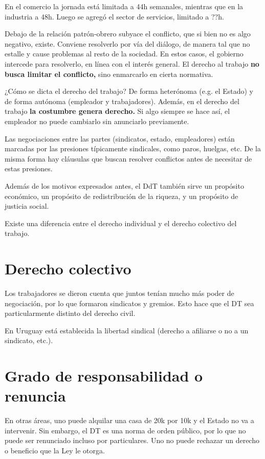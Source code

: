 \documentclass[../main.tex]{subfiles}
\begin{document}
En el comercio la jornada está limitada a 44h semanales, mientras que en la industria a 48h.
Luego se agregó el sector de servicios, limitado a ??h.

Debajo de la relación patrón-obrero subyace el conflicto, que si bien no es algo negativo, existe.
Conviene resolverlo por vía del diálogo, de manera tal que no estalle y cause problemas al resto de la sociedad.
En estos casos, el gobierno intercede para resolverlo, en línea con el interés general.
El derecho al trabajo \textbf{no busca limitar el conflicto,} sino enmarcarlo en cierta normativa.

¿Cómo se dicta el derecho del trabajo?
De forma heterónoma (e.g. el Estado) y de forma autónoma (empleador y trabajadores).
Además, en el derecho del trabajo \textbf{la costumbre genera derecho.}
Si algo siempre se hace así, el empleador no puede cambiarlo sin anunciarlo previamente.

Las negociaciones entre las partes (sindicatos, estado, empleadores) están marcadas por las presiones típicamente sindicales, como paros, huelgas, etc.
De la misma forma hay cláusulas que buscan resolver conflictos antes de necesitar de estas presiones.

Además de los motivos expresados antes, el DdT también sirve un propósito económico, un propósito de redistribución de la riqueza, y un propósito de justicia social.

Existe una diferencia entre el derecho individual y el derecho colectivo del trabajo.

\section{Derecho colectivo}

Los trabajadores se dieron cuenta que juntos tenían mucho más poder de negociación, por lo que formaron sindicatos y gremios.
Esto hace que el DT sea particularmente distinto del derecho civil.

En Uruguay está establecida la libertad sindical (derecho a afiliarse o no a un sindicato, etc.).

\section{Grado de responsabilidad o renuncia}

En otras áreas, uno puede alquilar una casa de 20k por 10k y el Estado no va a intervenir.
Sin embargo, el DT es una norma de orden público, por lo que no puede ser renunciado incluso por particulares.
Uno no puede rechazar un derecho o beneficio que la Ley le otorga.
\end{document}
